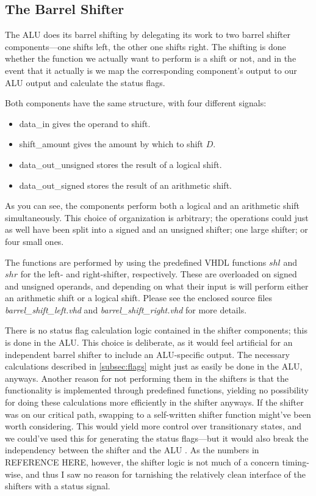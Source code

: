 \documentclass{article}
\begin{document}
\subsection{The Barrel Shifter}
\label{subsec:barrelshifter}
The ALU does its barrel shifting by delegating its work to two barrel shifter components---one shifts left, the other one shifts right. The shifting is done whether the function we actually want to perform is a shift or not, and in the event that it actually is we map the corresponding component's output to our ALU output and calculate the status flags. 

Both components have the same structure, with four different signals:
\begin{itemize}
\item data\_in gives the operand to shift.
\item shift\_amount gives the amount by which to shift $D$.
\item data\_out\_unsigned stores the result of a logical shift.
\item data\_out\_signed stores the result of an arithmetic shift.
\end{itemize}
As you can see, the components perform both a logical and an arithmetic shift simultaneously. This choice of organization is arbitrary; the operations could just as well have been split into a signed and an unsigned shifter; one large shifter; or four small ones. 

The functions are performed by using the predefined VHDL functions $shl$ and $shr$ for the left- and right-shifter, respectively. These are overloaded on signed and unsigned operands, and depending on what their input is will perform either an arithmetic shift or a logical shift. Please see the enclosed source files \emph{barrel\_shift\_left.vhd} and \emph{barrel\_shift\_right.vhd} for more details. 

There is no status flag calculation logic contained in the shifter components; this is done in the ALU. This choice is deliberate, as it would feel artificial for an independent barrel shifter to include an ALU-specific output. The necessary calculations described in \autoref{subsec:flags} might just as easily be done in the ALU, anyways. Another reason for not performing them in the shifters is that the functionality is implemented through predefined functions, yielding no  possibility for doing these calculations more efficiently in the shifter anyways. If the shifter was on our critical path, swapping to a self-written shifter function might've been worth considering. This would yield more control over transitionary states, and we could've used this for generating the status flags---but it would also break the independency between the shifter and the ALU . As the numbers in REFERENCE HERE, however, the shifter logic is not much of a concern timing-wise, and thus I saw no reason for tarnishing the relatively clean interface of the shifters with a status signal.
\end{document}
